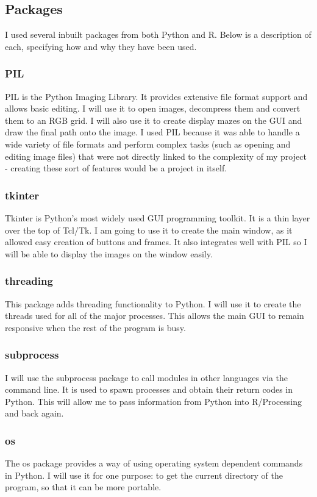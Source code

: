 \documentclass[titlepage]{article}
\begin{document}
\subsection{Packages}
I used several inbuilt packages from both Python and R. Below is a description of each, specifying how and why they have been used. 

\subsubsection{PIL}
PIL is the Python Imaging Library. It provides extensive file format support and allows basic editing. I will use it to open images, decompress them and convert them to an RGB grid. I will also use it to create display mazes on the GUI and draw the final path onto the image. I used PIL because it was able to handle a wide variety of file formats and perform complex tasks (such as opening and editing image files) that were not directly linked to the complexity of my project - creating these sort of features would be a project in itself. 

\subsubsection{tkinter}
Tkinter is Python's most widely used GUI programming toolkit. It is a thin layer over the top of Tcl/Tk. I am going to use it to create the main window, as it allowed easy creation of buttons and frames. It also integrates well with PIL so I will be able to display the images on the window easily.

\subsubsection{threading}
This package adds threading functionality to Python. I will use it to create the threads used for all of the major processes. This allows the main GUI to remain responsive when the rest of the program is busy.

\subsubsection{subprocess}
I will use the subprocess package to call modules in other languages via the command line. It is used to spawn processes and obtain their return codes in Python. This will allow me to pass information from Python into R/Processing and back again.

\subsubsection{os}
The os package provides a way of using operating system dependent commands in Python. I will use it for one purpose: to get the current directory of the program, so that it can be more portable.
\end{document}
